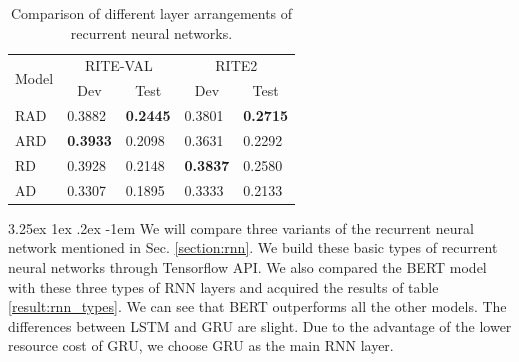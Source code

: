 \documentclass[12pt]{article}
\makeatletter
\renewcommand\paragraph{\@startsection{paragraph}{5}{\z@}%
  {3.25ex \@plus1ex \@minus.2ex}%
  {-1em}%
  {\normalfont\normalsize\bfseries}}
\makeatother
\begin{document}
\begin{CJK*}{UTF8}{bkai}
\begin{spacing}{1.77}
\begin{table}[H]
  \centering
  \setlength{\extrarowheight}{-3pt}
  \begin{tabular}{|l|l|l|l|l|}
  \hline
  \multicolumn{1}{|c|}{\multirow{2}{*}{Model}} & \multicolumn{2}{c|}{RITE-VAL} & \multicolumn{2}{c|}{RITE2} \\ \cline{2-5}
  \multicolumn{1}{|c|}{} & \multicolumn{1}{c|}{Dev} & \multicolumn{1}{c|}{Test} & \multicolumn{1}{c|}{Dev} & \multicolumn{1}{c|}{Test} \\ \hline
  RAD & 0.3882 & \textbf{0.2445} & 0.3801 & \textbf{0.2715} \\ \hline
  ARD & \textbf{0.3933} & 0.2098 & 0.3631 & 0.2292 \\ \hline
  RD & 0.3928 & 0.2148 & \textbf{0.3837} & 0.2580 \\ \hline
  AD & 0.3307 & 0.1895 & 0.3333 & 0.2133 \\ \hline
  \end{tabular}
  \caption{Comparison of different layer arrangements of recurrent neural networks.}
  \label{result:nn_types_comparison}
\end{table}

\paragraph{}
We will compare three variants of the recurrent neural network mentioned in Sec. \ref{section:rnn}. We build these basic types of recurrent neural networks through Tensorflow API. We also compared the BERT model with these three types of RNN layers and acquired the results of table \ref{result:rnn_types}. We can see that BERT outperforms all the other models. The differences between LSTM and GRU are slight. Due to the advantage of the lower resource cost of GRU, we choose GRU as the main RNN layer.


\end{spacing}
\end{CJK*}
\end{document}
